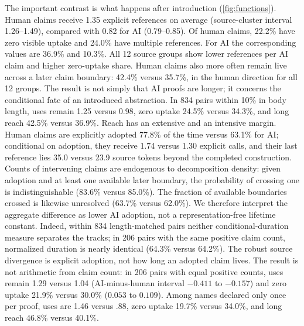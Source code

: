 \documentclass[10pt]{article}
\begin{document}
The important contrast is what happens after introduction (\cref{fig:functions}).  Human claims
receive 1.35 explicit references on average (source-cluster interval 1.26--1.49), compared with
0.82 for AI (0.79--0.85).  Of human claims, 22.2\% have zero visible uptake and 24.0\% have multiple
references.  For AI the corresponding values are 36.9\% and 10.3\%.  All 12 source groups show
lower references per AI claim and higher zero-uptake share.  Human claims also more often remain
live across a later claim boundary: 42.4\% versus 35.7\%, in the human direction for all 12
groups.  The result is not simply that AI proofs are longer; it concerns the conditional fate of an
introduced abstraction.  In 834 pairs within 10\% in body length, uses remain 1.25 versus 0.98,
zero uptake 24.5\% versus 34.3\%, and long reach 42.5\% versus 36.9\%.
Reach has an extensive and an intensive margin.  Human claims are explicitly adopted 77.8\% of
the time versus 63.1\% for AI; conditional on adoption, they receive 1.74 versus 1.30 explicit calls,
and their last reference lies 35.0 versus 23.9 source tokens beyond the completed construction.  Counts of intervening claims are endogenous to decomposition density:
given adoption and at least one available later boundary, the probability of crossing one is
indistinguishable (83.6\% versus 85.0\%).  The fraction of available boundaries crossed is likewise
unresolved (63.7\% versus 62.0\%).  We therefore interpret the aggregate difference
as lower AI adoption, not a representation-free lifetime constant.  Indeed, within 834
length-matched pairs neither conditional-duration measure separates the tracks; in 206 pairs with
the same positive claim count, normalized duration is nearly identical (64.3\% versus 64.2\%).  The
robust source divergence is explicit adoption, not how long an adopted claim lives.
The result is not arithmetic from claim count: in 206 pairs with equal positive counts, uses remain
1.29 versus 1.04 (AI-minus-human interval $-0.411$ to $-0.157$) and zero uptake 21.9\% versus
30.0\% ($0.053$ to $0.109$).  Among names declared only once per proof, uses are 1.46 versus .88,
zero uptake 19.7\% versus 34.0\%, and long reach 46.8\% versus 40.1\%.
\end{document}
